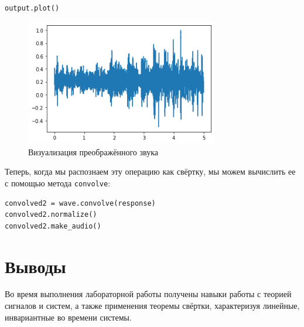 \documentclass[a4paper,12pt]{report}
\begin{document}
\begin{lstlisting}[caption=Визуализация преображённого звука]
output.plot()
\end{lstlisting}

\begin{figure}[H]
        \centering
        \includegraphics[width=0.75\textwidth]{14.png}
        \caption{Визуализация преображённого звука}
        \label{14}
\end{figure}

Теперь, когда мы распознаем эту операцию как свёртку, мы можем вычислить ее с помощью метода \texttt{convolve}:

\begin{lstlisting}[caption=Моделирование при помощи \texttt{convolve}]
convolved2 = wave.convolve(response)
convolved2.normalize()
convolved2.make_audio()
\end{lstlisting}

\chapter{Выводы}

Во время выполнения лабораторной работы получены навыки работы с теорией сигналов и систем, а также применения теоремы свёртки, характеризуя линейные, инвариантные во времени системы.
\end{document}
